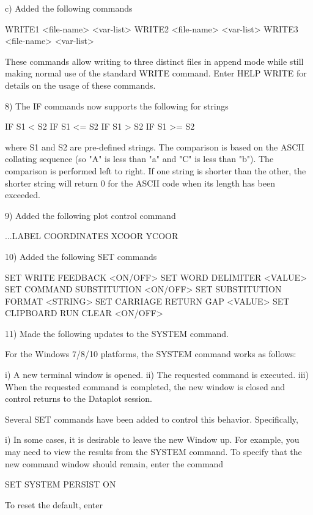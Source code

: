     c) Added the following commands

          WRITE1 <file-name> <var-list>
          WRITE2 <file-name> <var-list>
          WRITE3 <file-name> <var-list>

       These commands allow writing to three distinct files in
       append mode while still making normal use of the standard
       WRITE command.  Enter HELP WRITE for details on the usage
       of these commands.

 8) The IF commands now supports the following for strings

        IF S1 <  S2
        IF S1 <= S2
        IF S1 >  S2
        IF S1 >= S2

     where S1 and S2 are pre-defined strings.  The comparison is based
     on the ASCII collating sequence (so "A" is less than "a" and "C" is
     less than  "b").  The comparison is performed left to right.  If
     one string is shorter than the other, the shorter string will
     return 0 for the ASCII code when its length has been exceeded.

 9) Added the following plot control command

        ...LABEL COORDINATES XCOOR YCOOR

10) Added the following SET commands

       SET WRITE FEEDBACK <ON/OFF>
       SET WORD DELIMITER <VALUE>
       SET COMMAND SUBSTITUTION <ON/OFF>
       SET SUBSTITUTION FORMAT <STRING>
       SET CARRIAGE RETURN GAP <VALUE>
       SET CLIPBOARD RUN CLEAR <ON/OFF>

11) Made the following updates to the SYSTEM command.

    For the Windows 7/8/10 platforms, the SYSTEM command works
    as follows:

      i) A new terminal window is opened.
     ii) The requested command is executed.
    iii) When the requested command is completed, the new window is
         closed and control returns to the Dataplot session.

    Several SET commands have been added to control this behavior.
    Specifically,

      i) In some cases, it is desirable to leave the new Window up.
         For example, you may need to view the results from the
         SYSTEM command.  To specify that the new command window
         should remain, enter the command

              SET SYSTEM PERSIST ON

         To reset the default, enter

